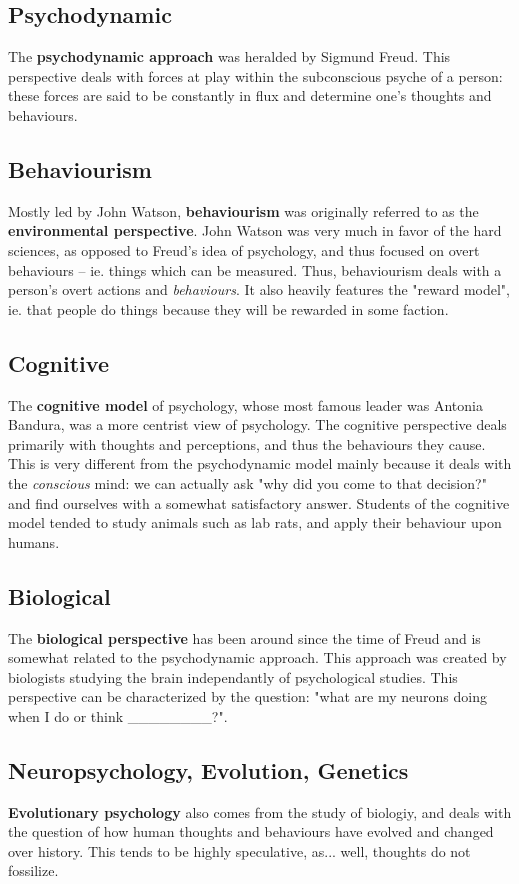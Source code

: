 \documentclass[12pt]{article}
\begin{document}
\subsection*{Psychodynamic}
The {\bf psychodynamic approach} was heralded by Sigmund Freud. This perspective deals with forces at play within the subconscious psyche of a person: these forces are said to be constantly in flux and determine one's thoughts and behaviours.

\subsection*{Behaviourism}
Mostly led by John Watson, {\bf behaviourism} was originally referred to as the {\bf environmental perspective}. John Watson was very much in favor of the hard sciences, as opposed to Freud's idea of psychology, and thus focused on overt behaviours -- ie. things which can be measured. Thus, behaviourism deals with a person's overt actions and {\it behaviours}. It also heavily features the "reward model", ie. that people do things because they will be rewarded in some faction.

\subsection*{Cognitive}
The {\bf cognitive model} of psychology, whose most famous leader was Antonia Bandura, was a more centrist view of psychology. The cognitive perspective deals primarily with thoughts and perceptions, and thus the behaviours they cause. This is very different from the psychodynamic model mainly because it deals with the {\it conscious} mind: we can actually ask "why did you come to that decision?" and find ourselves with a somewhat satisfactory answer. Students of the cognitive model tended to study animals such as lab rats, and apply their behaviour upon humans.

\subsection*{Biological}
The {\bf biological perspective} has been around since the time of Freud and is somewhat related to the psychodynamic approach. This approach was created by biologists studying the brain independantly of psychological studies. This perspective can be characterized by the question: "what are my neurons doing when I do or think \_\_\_\_\_\_\_\_?".

\subsection*{Neuropsychology, Evolution, Genetics}
{\bf Evolutionary psychology} also comes from the study of biologiy, and deals with the question of how human thoughts and behaviours have evolved and changed over history. This tends to be highly speculative, as... well, thoughts do not fossilize.
\end{document}
